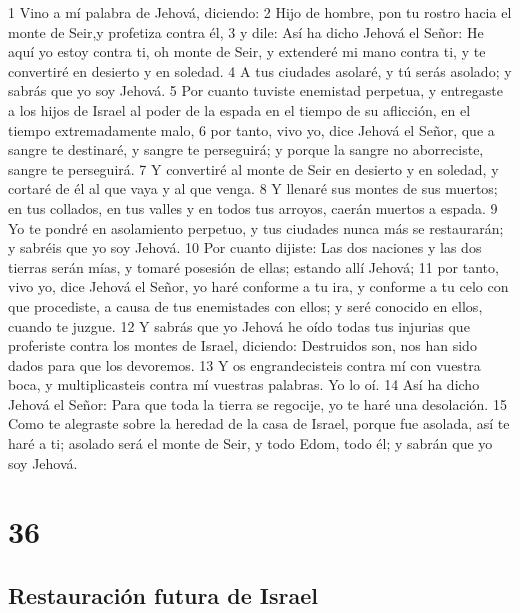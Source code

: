 1 Vino a mí palabra de Jehová, diciendo:
2 Hijo de hombre, pon tu rostro hacia el monte de Seir,y profetiza contra él,
3 y dile: Así ha dicho Jehová el Señor: He aquí yo estoy contra ti, oh monte de Seir, y extenderé mi mano contra ti, y te convertiré en desierto y en soledad.
4 A tus ciudades asolaré, y tú serás asolado; y sabrás que yo soy Jehová.
5 Por cuanto tuviste enemistad perpetua, y entregaste a los hijos de Israel al poder de la espada en el tiempo de su aflicción, en el tiempo extremadamente malo,
6 por tanto, vivo yo, dice Jehová el Señor, que a sangre te destinaré, y sangre te perseguirá; y porque la sangre no aborreciste, sangre te perseguirá.
7 Y convertiré al monte de Seir en desierto y en soledad, y cortaré de él al que vaya y al que venga.
8 Y llenaré sus montes de sus muertos; en tus collados, en tus valles y en todos tus arroyos, caerán muertos a espada.
9 Yo te pondré en asolamiento perpetuo, y tus ciudades nunca más se restaurarán; y sabréis que yo soy Jehová.
10 Por cuanto dijiste: Las dos naciones y las dos tierras serán mías, y tomaré posesión de ellas; estando allí Jehová;
11 por tanto, vivo yo, dice Jehová el Señor, yo haré conforme a tu ira, y conforme a tu celo con que procediste, a causa de tus enemistades con ellos; y seré conocido en ellos, cuando te juzgue.
12 Y sabrás que yo Jehová he oído todas tus injurias que proferiste contra los montes de Israel, diciendo: Destruidos son, nos han sido dados para que los devoremos.
13 Y os engrandecisteis contra mí con vuestra boca, y multiplicasteis contra mí vuestras palabras. Yo lo oí.
14 Así ha dicho Jehová el Señor: Para que toda la tierra se regocije, yo te haré una desolación.
15 Como te alegraste sobre la heredad de la casa de Israel, porque fue asolada, así te haré a ti; asolado será el monte de Seir, y todo Edom, todo él; y sabrán que yo soy Jehová. 

\chapter{36}

\section*{Restauración futura de Israel}

